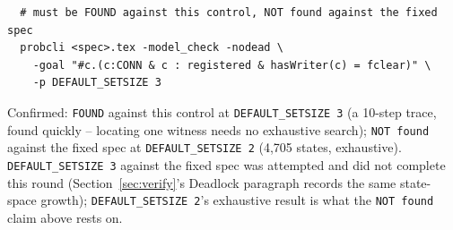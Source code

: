 \documentclass[a4paper,10pt,fleqn]{article}
\begin{document}
\begin{verbatim}
  # must be FOUND against this control, NOT found against the fixed spec
  probcli <spec>.tex -model_check -nodead \
    -goal "#c.(c:CONN & c : registered & hasWriter(c) = fclear)" \
    -p DEFAULT_SETSIZE 3
\end{verbatim}

Confirmed: \texttt{FOUND} against this control at
\texttt{DEFAULT\_SETSIZE 3} (a 10-step trace, found quickly -- locating one
witness needs no exhaustive search); \texttt{NOT found} against the fixed
spec at \texttt{DEFAULT\_SETSIZE 2} (4{,}705 states, exhaustive).
\texttt{DEFAULT\_SETSIZE 3} against the fixed spec was attempted and did
not complete this round (Section~\ref{sec:verify}'s Deadlock paragraph
records the same state-space growth); \texttt{DEFAULT\_SETSIZE 2}'s
exhaustive result is what the \texttt{NOT found} claim above rests on.
\end{document}
